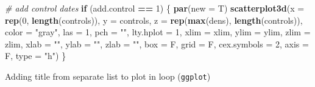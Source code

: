 \documentclass[10,portrait]{article}
\newenvironment{Shaded}{\begin{snugshade}}{\end{snugshade}}
\newcommand{\KeywordTok}[1]{\textcolor[rgb]{0.13,0.29,0.53}{\textbf{#1}}}
\newcommand{\DataTypeTok}[1]{\textcolor[rgb]{0.13,0.29,0.53}{#1}}
\newcommand{\DecValTok}[1]{\textcolor[rgb]{0.00,0.00,0.81}{#1}}
\newcommand{\StringTok}[1]{\textcolor[rgb]{0.31,0.60,0.02}{#1}}
\newcommand{\CommentTok}[1]{\textcolor[rgb]{0.56,0.35,0.01}{\textit{#1}}}
\newcommand{\ControlFlowTok}[1]{\textcolor[rgb]{0.13,0.29,0.53}{\textbf{#1}}}
\newcommand{\OperatorTok}[1]{\textcolor[rgb]{0.81,0.36,0.00}{\textbf{#1}}}
\newcommand{\NormalTok}[1]{#1}
\begin{document}
\begin{Shaded}
\begin{Highlighting}[]
\CommentTok{# add control dates}
\ControlFlowTok{if}\NormalTok{ (add.control }\OperatorTok{==}\StringTok{ }\DecValTok{1}\NormalTok{) \{}
    \KeywordTok{par}\NormalTok{(}\DataTypeTok{new =}\NormalTok{ T)}
    \KeywordTok{scatterplot3d}\NormalTok{(}\DataTypeTok{x =} \KeywordTok{rep}\NormalTok{(}\DecValTok{0}\NormalTok{, }\KeywordTok{length}\NormalTok{(controls)), }\DataTypeTok{y =}\NormalTok{ controls, }
        \DataTypeTok{z =} \KeywordTok{rep}\NormalTok{(}\KeywordTok{max}\NormalTok{(dens), }\KeywordTok{length}\NormalTok{(controls)), }\DataTypeTok{color =} \StringTok{"gray"}\NormalTok{, }
        \DataTypeTok{las =} \DecValTok{1}\NormalTok{, }\DataTypeTok{pch =} \StringTok{""}\NormalTok{, }\DataTypeTok{lty.hplot =} \DecValTok{1}\NormalTok{, }\DataTypeTok{xlim =}\NormalTok{ xlim, }
        \DataTypeTok{ylim =}\NormalTok{ ylim, }\DataTypeTok{zlim =}\NormalTok{ zlim, }\DataTypeTok{xlab =} \StringTok{""}\NormalTok{, }\DataTypeTok{ylab =} \StringTok{""}\NormalTok{, }
        \DataTypeTok{zlab =} \StringTok{""}\NormalTok{, }\DataTypeTok{box =}\NormalTok{ F, }\DataTypeTok{grid =}\NormalTok{ F, }\DataTypeTok{cex.symbols =} \DecValTok{2}\NormalTok{, }
        \DataTypeTok{axis =}\NormalTok{ F, }\DataTypeTok{type =} \StringTok{"h"}\NormalTok{)}
\NormalTok{\}}
\end{Highlighting}
\end{Shaded}

Adding title from separate list to plot in loop (\texttt{ggplot})
\end{document}
